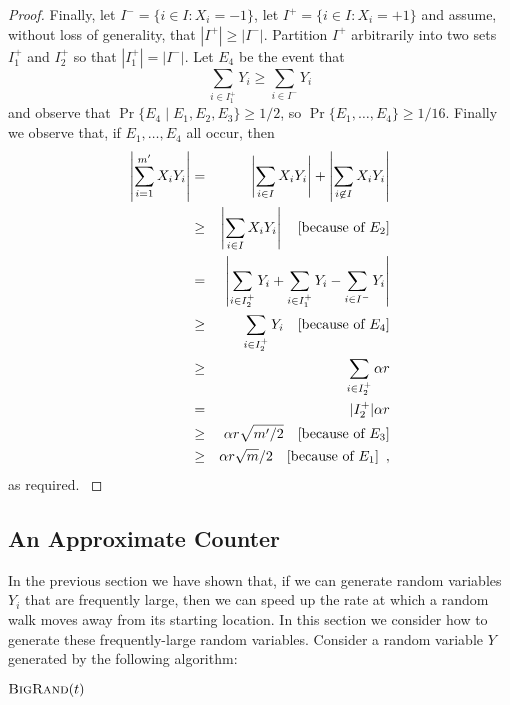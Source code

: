 \documentclass[lotsofwhite]{patmorin}
\newcommand{\bigrand}{\textsc{BigRand}}
\newcommand{\note}[1]{\enspace\enspace\hfill{\mbox{[#1]}}}
\begin{document}
\begin{proof}
{Finally, let $I^-=\{i\in I:X_i=-1\}$, let $I^+=\{i\in I:X_i=+1\}$ and
assume, without loss of generality, that $|I^+| \ge |I^-|$.  Partition
$I^+$ arbitrarily into two sets $I^+_1$ and $I^+_2$ so that
$|I^+_1|=|I^-|$. Let $E_4$ be the event that
\[
     \sum_{i\in I^+_1} Y_i \ge  \sum_{i\in I^-} Y_i 
\]
and observe that $\Pr\{E_4\mid E_1,E_2,E_3\} \ge 1/2$, so
$\Pr\{E_1,\ldots,E_4\} \ge 1/16$.  Finally we observe that, if
$E_1,\ldots,E_4$ all occur, then
\begin{eqnarray*}
  \left|\sum_{i=1}^{m'} X_iY_i\right|
   & = & \left|\sum_{i\in I} X_iY_i\right|  
           + \left|\sum_{i\not\in I} X_iY_i\right|  \\
   & \ge & \left|\sum_{i\in I} X_iY_i\right| 
           \note{because of $E_2$}\\
   & = & \left|\sum_{i\in I^+_2} Y_i
       +\sum_{i\in I^+_1} Y_i - \sum_{i\in I^-} Y_i\right| 
           \\
   & \ge & \sum_{i\in I^+_2} Y_i 
           \note{because of $E_4$} \\
   & \ge & \sum_{i\in I^+_2} \alpha r \\
   & = & |I^+_2|\alpha r \\
   & \ge & \alpha r\sqrt{m'/2} 
           \note{because of $E_3$} \\
   & \ge & \alpha r\sqrt{m}/2 
           \note{because of $E_1$} \enspace ,\\
\end{eqnarray*}
as required.
}
\end{proof}


\subsection{An Approximate Counter}

In the previous section we have shown that, if we can generate random
variables $Y_i$ that are frequently large, then we can speed up the
rate at which a random walk moves away from its starting location.  In
this section we consider how to generate these frequently-large random
variables.  Consider a random variable $Y$ generated by the following
algorithm:

\noindent
\begin{minipage}{\textwidth}
$\bigrand(t)$
\begin{algorithmic}[1]
  \ELSE
  \ENDIF
\ENDWHILE
{}
\end{algorithmic}
\end{minipage}
\end{document}
